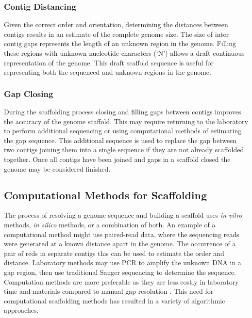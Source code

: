 \documentclass[10pt]{bmc_article}
\newenvironment{bmcformat}{\begin{raggedright}\baselineskip20pt\sloppy\setboolean{publ}{false}}{\end{raggedright}\baselineskip20pt\sloppy}
\begin{document}
\begin{bmcformat}
\subsubsection*{Contig Distancing} %

Given the correct order and orientation, determining the distances between
contigs results in an estimate of the complete genome size. The size of inter
contig gaps represents the length of an unknown region in the genome. Filling
these regions with unknown nucleotide characters (`N') allows a draft
continuous representation of the genome. This draft scaffold sequence is useful
for representing both the sequenced and unknown regions in the genome.

\subsubsection*{Gap Closing} %

During the scaffolding process closing and filling gaps between contigs
improves the accuracy of the genome scaffold. This may require returning to the
laboratory to perform additional sequencing or using computational methods of
estimating the gap sequence. This additional sequence is used to replace the
gap between two contigs joining them into a single sequence if they are not
already scaffolded together. Once all contigs have been joined and gaps in
a scaffold closed the genome may be considered finished.

\subsection*{Computational Methods for Scaffolding} %

The process of resolving a genome sequence and building a scaffold uses
\emph{in vitro} methods, \emph{in silico} methods, or a combination of both. An
example of a computational method might use paired-read data, where the
sequencing reads were generated at a known distance apart in the genome. The
occurrence of a pair of reds in separate contigs this can be used to estimate
the order and distance. Laboratory methods may use PCR to amplify the unknown
DNA in a gap region, then use traditional Sanger sequencing to determine the
sequence. Computation methods are more preferable as they are less costly in
laboratory time and materials compared to manual gap resolution
\cite{nagarajan2010}. This need for computational scaffolding methods has
resulted in a variety of algorithmic approaches. \pb


\end{bmcformat}
\end{document}
